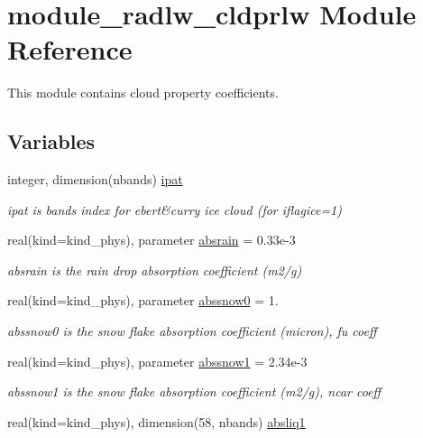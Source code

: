 \hypertarget{namespacemodule__radlw__cldprlw}{}\section{module\+\_\+radlw\+\_\+cldprlw Module Reference}
\label{namespacemodule__radlw__cldprlw}


This module contains cloud property coefficients.  


\subsection*{Variables}
\begin{DoxyCompactItemize}
\item 
integer, dimension(nbands) \hyperlink{namespacemodule__radlw__cldprlw_a9e8ebd81d5d62c2be4c006a595493aed}{ipat}
\begin{DoxyCompactList}\small\item\em ipat is bands index for ebert\&curry ice cloud (for iflagice=1) \end{DoxyCompactList}\item 
real(kind=kind\+\_\+phys), parameter \hyperlink{namespacemodule__radlw__cldprlw_a04bff194fec27e0586ab1b4770319882}{absrain} = 0.\+33e-\/3
\begin{DoxyCompactList}\small\item\em absrain is the rain drop absorption coefficient (m2/g) \end{DoxyCompactList}\item 
real(kind=kind\+\_\+phys), parameter \hyperlink{namespacemodule__radlw__cldprlw_a4bcd58c6a7e9abdfbb8f8ec7d925d143}{abssnow0} = 1.
\begin{DoxyCompactList}\small\item\em abssnow0 is the snow flake absorption coefficient (micron), fu coeff \end{DoxyCompactList}\item 
real(kind=kind\+\_\+phys), parameter \hyperlink{namespacemodule__radlw__cldprlw_a7d12b328d9dec0c525a4b0824ae7ab44}{abssnow1} = 2.\+34e-\/3
\begin{DoxyCompactList}\small\item\em abssnow1 is the snow flake absorption coefficient (m2/g), ncar coeff \end{DoxyCompactList}\item 
real(kind=kind\+\_\+phys), dimension(58, nbands) \hyperlink{namespacemodule__radlw__cldprlw_a57896538226e9184c3750440d9f62166}{absliq1}

\end{DoxyCompactItemize}

